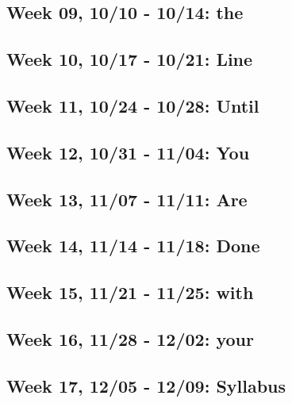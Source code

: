 \documentclass[11pt,]{article}
\begin{document}
\hypertarget{week-09-1010---1014-the}{%
\subsection{Week 09, 10/10 - 10/14: the}\label{week-09-1010---1014-the}}

\hypertarget{week-10-1017---1021-line}{%
\subsection{Week 10, 10/17 - 10/21:
Line}\label{week-10-1017---1021-line}}

\hypertarget{week-11-1024---1028-until}{%
\subsection{Week 11, 10/24 - 10/28:
Until}\label{week-11-1024---1028-until}}

\hypertarget{week-12-1031---1104-you}{%
\subsection{Week 12, 10/31 - 11/04: You}\label{week-12-1031---1104-you}}

\hypertarget{week-13-1107---1111-are}{%
\subsection{Week 13, 11/07 - 11/11: Are}\label{week-13-1107---1111-are}}

\hypertarget{week-14-1114---1118-done}{%
\subsection{Week 14, 11/14 - 11/18:
Done}\label{week-14-1114---1118-done}}

\hypertarget{week-15-1121---1125-with}{%
\subsection{Week 15, 11/21 - 11/25:
with}\label{week-15-1121---1125-with}}

\hypertarget{week-16-1128---1202-your}{%
\subsection{Week 16, 11/28 - 12/02:
your}\label{week-16-1128---1202-your}}

\hypertarget{week-17-1205---1209-syllabus}{%
\subsection{Week 17, 12/05 - 12/09:
Syllabus}\label{week-17-1205---1209-syllabus}}
\end{document}
